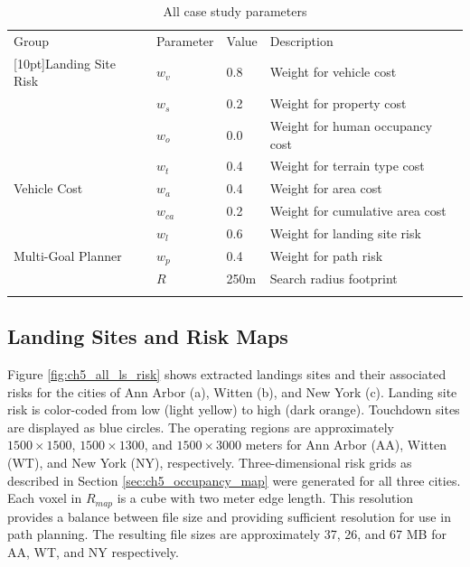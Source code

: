 \begin{table}[ht]
\centering
\caption{All case study parameters}
\label{table:ch5_weights}
\begin{tabular}{@{}llll@{}}
\hline\noalign{\smallskip}
Group                                           & Parameter    & Value                     & Description                \\ 
\noalign{\smallskip}\hline\noalign{\smallskip}
\multirow{3}{*}[10pt]{Landing Site Risk}        & $w_v$         & 0.8                       & Weight for vehicle cost    \\
                                                & $w_s$        & 0.2                       & Weight for property cost \\
                                                & $w_o$        & 0.0                       & Weight for human occupancy cost   \\
\multirow{3}{*}[10pt]{Vehicle Cost}        & $w_t$         & 0.4                       & Weight for terrain type cost    \\
                                                & $w_a$        & 0.4                       & Weight for area cost \\
                                                & $w_{ca}$        & 0.2                       & Weight for cumulative area cost   \\
\multirow{3}{*}[10pt]{Multi-Goal Planner}       & $w_l$        & 0.6                       & Weight for landing site risk    \\
                                                & $w_p$        & 0.4                       & Weight for path risk   \\
                                                & $R$        & 250m                       & Search radius footprint   \\
\noalign{\smallskip}\hline\noalign{\smallskip}
\end{tabular}
\end{table}

\subsection{Landing Sites and Risk Maps}\label{sec:ch5_generated_maps}

Figure \ref{fig:ch5_all_ls_risk} shows extracted landings sites and their associated risks for the cities of Ann Arbor (a), Witten (b), and New York (c). Landing site risk is color-coded from low (light yellow) to high (dark orange). Touchdown sites are displayed as blue circles.
The operating regions are approximately $1500\times1500$, $1500\times1300$, and $1500\times3000$ meters for Ann Arbor (AA), Witten (WT), and New York (NY), respectively. Three-dimensional risk grids as described in Section \ref{sec:ch5_occupancy_map} were generated for all three cities. Each voxel in $R_{map}$ is a cube with two meter edge length. This resolution provides a balance between file size and providing sufficient resolution for use in path planning. The resulting file sizes are approximately 37, 26, and 67 MB for AA, WT, and NY respectively.

